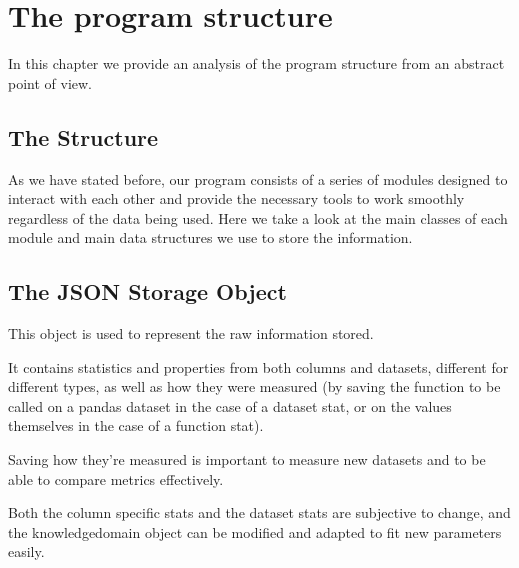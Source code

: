 %
%

\chapter{The program structure}

\begin{resumen}
In this chapter we provide an analysis of the program structure from an abstract point of view.
\end{resumen}


\section{The Structure}
\label{cap2:sec:structure}

As we have stated before, our program consists of a series of modules designed to interact with each other and provide the necessary tools to work smoothly regardless of the data being used.
Here we take a look at the main classes of each module and main data structures we use to store the information.

\section{The JSON Storage Object}
\label{cap2:sec:json}

This object is used to represent the raw information stored.

It contains statistics and properties from both columns and datasets, different for different types, as well as how they were measured (by saving the function to be called on a pandas dataset in the case of a dataset stat, or on the values themselves in the case of a function stat).

Saving how they're measured is important to measure new datasets and to be able to compare metrics effectively.

Both the column specific stats and the dataset stats are subjective to change, and the knowledgedomain object can be modified and adapted to fit new parameters easily.

